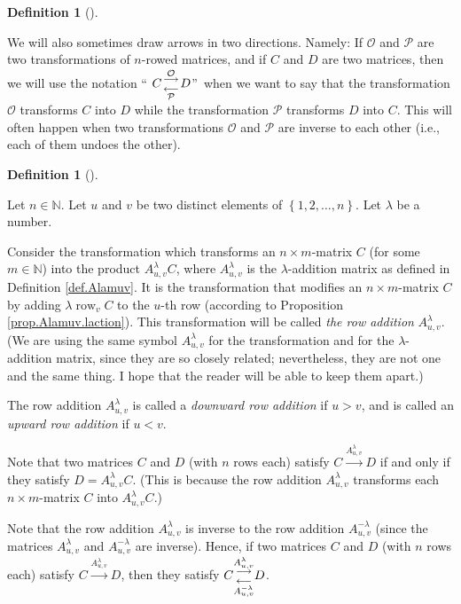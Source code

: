 \documentclass[numbers=enddot,12pt,final,onecolumn,notitlepage]{scrartcl}%
\theoremstyle{definition}
\newtheorem{defi}[theo]{Definition}
\newenvironment{definition}[1][]
{\begin{defi}[#1]\begin{leftbar}}
{\end{leftbar}\end{defi}}
\begin{document}
\begin{definition}
We will also sometimes draw arrows in two directions. Namely: If $\mathcal{O}$
and $\mathcal{P}$ are two transformations of $n$-rowed matrices, and if $C$
and $D$ are two matrices, then we will use the notation \textquotedblleft%
$C\underset{\mathcal{P}}{\overset{\mathcal{O}}{%
\genfrac{}{}{0pt}{1}{\longrightarrow}{\longleftarrow}%
}}D$\textquotedblright\ when we want to say that the transformation
$\mathcal{O}$ transforms $C$ into $D$ while the transformation $\mathcal{P}$
transforms $D$ into $C$. This will often happen when two transformations
$\mathcal{O}$ and $\mathcal{P}$ are inverse to each other (i.e., each of them
undoes the other).
\end{definition}

\begin{definition}
\label{def.row-ops.row-add}Let $n\in\mathbb{N}$. Let $u$ and $v$ be two
distinct elements of $\left\{  1,2,\ldots,n\right\}  $. Let $\lambda$ be a number.

Consider the transformation which transforms an $n\times m$-matrix $C$ (for
some $m\in\mathbb{N}$) into the product $A_{u,v}^{\lambda}C$, where
$A_{u,v}^{\lambda}$ is the $\lambda$-addition matrix as defined in Definition
\ref{def.Alamuv}. It is the transformation that modifies an $n\times m$-matrix
$C$ by adding $\lambda\operatorname*{row}\nolimits_{v}C$ to the $u$-th row
(according to Proposition \ref{prop.Alamuv.laction}). This transformation will
be called \textit{the row addition }$A_{u,v}^{\lambda}$. (We are using the
same symbol $A_{u,v}^{\lambda}$ for the transformation and for the $\lambda
$-addition matrix, since they are so closely related; nevertheless, they are
not one and the same thing. I hope that the reader will be able to keep them apart.)

The row addition $A_{u,v}^{\lambda}$ is called a \textit{downward row
addition} if $u>v$, and is called an \textit{upward row addition} if $u<v$.

Note that two matrices $C$ and $D$ (with $n$ rows each) satisfy
$C\overset{A_{u,v}^{\lambda}}{\longrightarrow}D$ if and only if they satisfy
$D=A_{u,v}^{\lambda}C$. (This is because the row addition $A_{u,v}^{\lambda}$
transforms each $n\times m$-matrix $C$ into $A_{u,v}^{\lambda}C$.)

Note that the row addition $A_{u,v}^{\lambda}$ is inverse to the row addition
$A_{u,v}^{-\lambda}$ (since the matrices $A_{u,v}^{\lambda}$ and
$A_{u,v}^{-\lambda}$ are inverse). Hence, if two matrices $C$ and $D$ (with
$n$ rows each) satisfy $C\overset{A_{u,v}^{\lambda}}{\longrightarrow}D$, then
they satisfy $C\underset{A_{u,v}^{-\lambda}}{\overset{A_{u,v}^{\lambda}}{%
\genfrac{}{}{0pt}{1}{\longrightarrow}{\longleftarrow}%
}}D$.
\end{definition}
\end{document}
